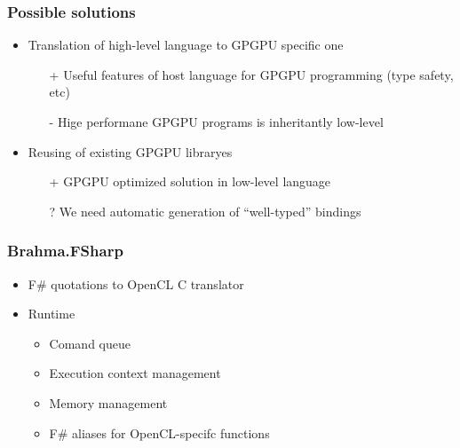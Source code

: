 \documentclass[xcolor=table]{beamer}
\begin{document}
\begin{frame}[fragile]
  \transwipe[direction=90]
  \frametitle{Possible solutions}
  \begin{itemize}
  \item Translation of high-level language to GPGPU specific one
    \begin{itemize}
  \item[+] Useful features of host language for GPGPU programming (type safety, etc)
  \item[-] Hige performane GPGPU programs is inheritantly low-level
  \end{itemize}
  \item Reusing of existing GPGPU libraryes
      \begin{itemize}
  \item[+] GPGPU optimized solution in low-level language
  \item[?] We need automatic generation of ``well-typed'' bindings
  \end{itemize}

  \end{itemize}
\end{frame}

\begin{frame}[fragile]
  \transwipe[direction=90]
  \frametitle{Brahma.FSharp}
  \begin{itemize}
  \item F\# quotations to OpenCL C translator
  \item Runtime
      \begin{itemize}
        \item Comand queue
        \item Execution context management
        \item Memory management
        \item F\# aliases for OpenCL-specifc functions
      \end{itemize}

  \end{itemize}
\end{frame}
\end{document}
